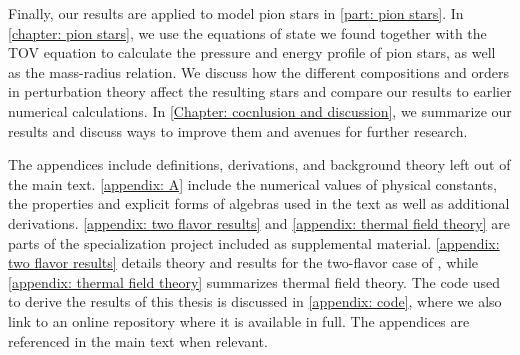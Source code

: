 Finally, our results are applied to model pion stars in \autoref{part: pion stars}.
In \autoref{chapter: pion stars}, we use the equations of state we found together with the TOV equation to calculate the pressure and energy profile of pion stars, as well as the mass-radius relation.
We discuss how the different compositions and orders in perturbation theory affect the resulting stars and compare our results to earlier numerical calculations.
In \autoref{Chapter: cocnlusion and discussion}, we summarize our results and discuss ways to improve them and avenues for further research.

The appendices include definitions, derivations, and background theory left out of the main text.
\autoref{appendix: A} include the numerical values of physical constants, the properties and explicit forms of algebras used in the text as well as additional derivations.
\autoref{appendix: two flavor results} and \autoref{appendix: thermal field theory} are parts of the specialization project included as supplemental material.
\autoref{appendix: two flavor results} details theory and results for the two-flavor case of \chpt, while \autoref{appendix: thermal field theory} summarizes thermal field theory.
The code used to derive the results of this thesis is discussed in \autoref{appendix: code}, where we also link to an online repository where it is available in full.
The appendices are referenced in the main text when relevant.

